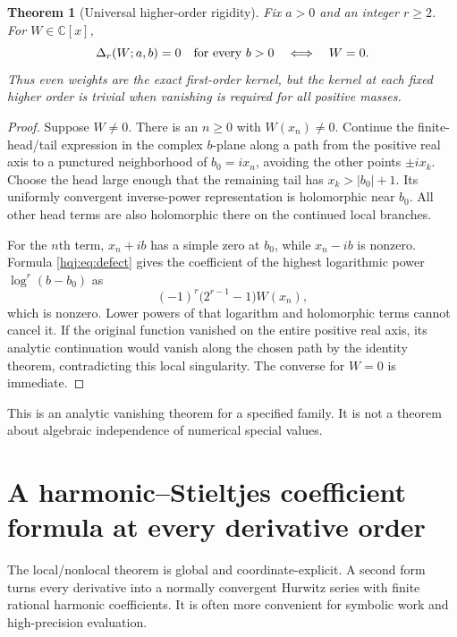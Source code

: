 \documentclass[11pt,letterpaper]{article}
\numberwithin{equation}{section}
\newtheorem{theorem}{Theorem}[section]
\theoremstyle{definition}
\newcommand{\C}{\mathbb C}
\begin{document}
\begin{theorem}[Universal higher-order rigidity]\label{hqj:thm:rigidity}
Fix $a>0$ and an integer $r\ge2$. For $W\in\C[x]$,
\[
\Delta_r(W;a,b)=0\quad\hbox{for every }b>0
\quad\Longleftrightarrow\quad W=0.
\]
Thus even weights are the exact first-order kernel, but the kernel at
each fixed higher order is trivial when vanishing is required for all
positive masses.
\end{theorem}
\begin{proof}
Suppose $W\ne0$. There is an $n\ge0$ with $W(x_n)\ne0$. Continue the
finite-head/tail expression in the complex $b$-plane along a path from
the positive real axis to a punctured neighborhood of $b_0=ix_n$,
avoiding the other points $\pm ix_k$. Choose the head large enough that
the remaining tail has $x_k>|b_0|+1$. Its uniformly convergent
inverse-power representation is holomorphic near $b_0$. All other
head terms are also holomorphic there on the continued local branches.

For the $n$th term, $x_n+ib$ has a simple zero at $b_0$, while
$x_n-ib$ is nonzero. Formula \eqref{hqj:eq:defect} gives the coefficient
of the highest logarithmic power $\log^r(b-b_0)$ as
\[
(-1)^r\bigl(2^{r-1}-1\bigr)W(x_n),
\]
which is nonzero. Lower powers of that logarithm and holomorphic terms
cannot cancel it. If the original function vanished on the entire
positive real axis, its analytic continuation would vanish along the
chosen path by the identity theorem, contradicting this local
singularity. The converse for $W=0$ is immediate.
\end{proof}
This is an analytic vanishing theorem for a specified family. It is not
a theorem about algebraic independence of numerical special values.


\section{A harmonic--Stieltjes coefficient formula at every derivative order}
\label{hqj:sec:harmonic}

The local/nonlocal theorem is global and coordinate-explicit. A second
form turns every derivative into a normally convergent Hurwitz series
with finite rational harmonic coefficients. It is often more convenient
for symbolic work and high-precision evaluation.
\end{document}
